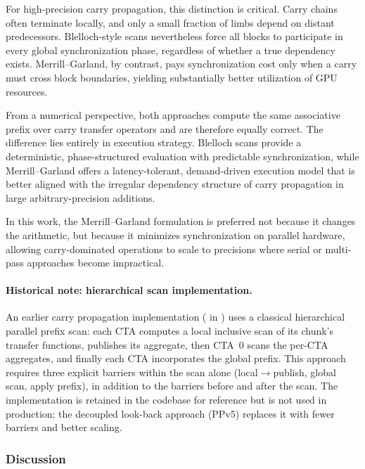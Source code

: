 For high-precision carry propagation, this distinction is critical. Carry chains
often terminate locally, and only a small fraction of limbs depend on distant
predecessors. Blelloch-style scans nevertheless force all blocks to participate
in every global synchronization phase, regardless of whether a true dependency
exists. Merrill--Garland, by contrast, pays synchronization cost only when a
carry must cross block boundaries, yielding substantially better utilization of
GPU resources.

From a numerical perspective, both approaches compute the same associative
prefix over carry transfer operators and are therefore equally correct. The
difference lies entirely in execution strategy. Blelloch scans provide a
deterministic, phase-structured evaluation with predictable synchronization,
while Merrill--Garland offers a latency-tolerant, demand-driven execution model
that is better aligned with the irregular dependency structure of carry
propagation in large arbitrary-precision additions.

In this work, the Merrill--Garland formulation is preferred not because it
changes the arithmetic, but because it minimizes synchronization on parallel
hardware, allowing carry-dominated operations to scale to precisions
where serial or multi-pass approaches become impractical.

\paragraph{Historical note: hierarchical scan implementation.}
An earlier carry propagation implementation
( in ) uses a
classical hierarchical parallel prefix scan: each CTA computes a local
inclusive scan of its chunk's transfer functions, publishes its
aggregate, then CTA~0 scans the per-CTA aggregates, and finally each
CTA incorporates the global prefix.  This approach requires three explicit
 barriers within the scan alone (local$\to$publish,
global scan, apply prefix), in addition to the barriers before and
after the scan.  The implementation is retained in the codebase for
reference but is not used in production; the decoupled look-back
approach (PPv5) replaces it with fewer barriers and better scaling.


\subsubsection{Discussion}

